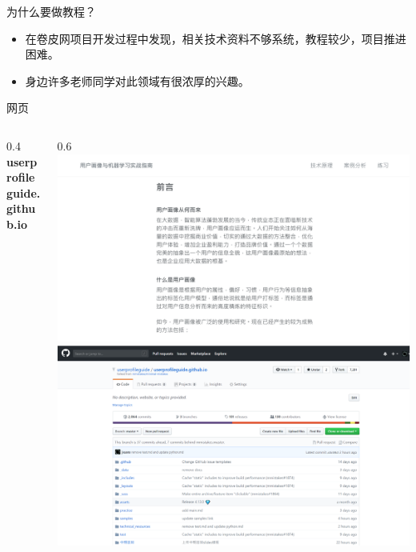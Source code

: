 \documentclass[10pt,aspectratio=32,handout]{beamer}
\begin{document}
\begin{frame}{为什么要做教程？}
  \begin{itemize}
    \item 在卷皮网项目开发过程中发现，相关技术资料不够系统，教程较少，项目推进困难。\newline
    \item 身边许多老师同学对此领域有很浓厚的兴趣。
  \end{itemize}
\end{frame}

\begin{frame}{网页}
\begin{columns}
  \begin{column}{0.4\paperheight}
    \textbf{userprofileguide.github.io}
  \end{column}
  \begin{column}{0.6\paperheight}
    \includegraphics[height=0.4\paperheight]{website1}
    \includegraphics[height=0.4\paperheight]{website2}
  \end{column}
  \end{columns}
\end{frame}
\end{document}
